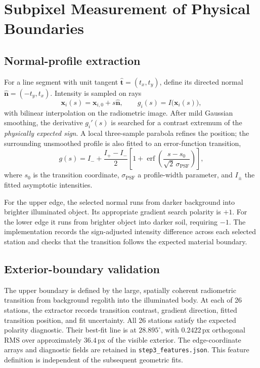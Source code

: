 \documentclass[11pt,letterpaper]{article}
\newcommand{\px}{\,\mathrm{px}}
\newcommand{\sourcepath}[1]{\nolinkurl{#1}}
\newcommand{\mat}[1]{\mathbf{#1}}
\begin{document}
\section{Subpixel Measurement of Physical Boundaries}
\label{sec:edges}

\subsection{Normal-profile extraction}

For a line segment with unit tangent \(\hat{\mat t}=(t_x,t_y)\), define its directed normal \(\hat{\mat n}=(-t_y,t_x)\). Intensity is sampled on rays
\begin{equation}
 \mat x_i(s)=\mat x_{i,0}+s\hat{\mat n},\qquad
 g_i(s)=I\bigl(\mat x_i(s)\bigr),
\end{equation}
with bilinear interpolation on the radiometric image. After mild Gaussian smoothing, the derivative \(g_i'(s)\) is searched for a contrast extremum of the \emph{physically expected sign}. A local three-sample parabola refines the position; the surrounding unsmoothed profile is also fitted to an error-function transition,
\begin{equation}
 g(s)=I_-+\frac{I_+-I_-}{2}
 \left[1+\operatorname{erf}\left(\frac{s-s_0}{\sqrt 2\,\sigma_{\mathrm{PSF}}}\right)\right],
 \label{eq:erf}
\end{equation}
where \(s_0\) is the transition coordinate, \(\sigma_{\mathrm{PSF}}\) a profile-width parameter, and \(I_\pm\) the fitted asymptotic intensities.

For the upper edge, the selected normal runs from darker background into brighter illuminated object. Its appropriate gradient search polarity is \(+1\). For the lower edge it runs from brighter object into darker soil, requiring \(-1\). The implementation records the sign-adjusted intensity difference across each selected station and checks that the transition follows the expected material boundary.

\subsection{Exterior-boundary validation}
\label{sec:exterior}

The upper boundary is defined by the large, spatially coherent radiometric transition from background regolith into the illuminated body. At each of 26 stations, the extractor records transition contrast, gradient direction, fitted transition position, and fit uncertainty. All 26 stations satisfy the expected polarity diagnostic. Their best-fit line is at $28.895^\circ$, with $0.2422\px$ orthogonal RMS over approximately $36.4\px$ of the visible exterior. The edge-coordinate arrays and diagnostic fields are retained in \sourcepath{step3_features.json}. This feature definition is independent of the subsequent geometric fits.
\end{document}
